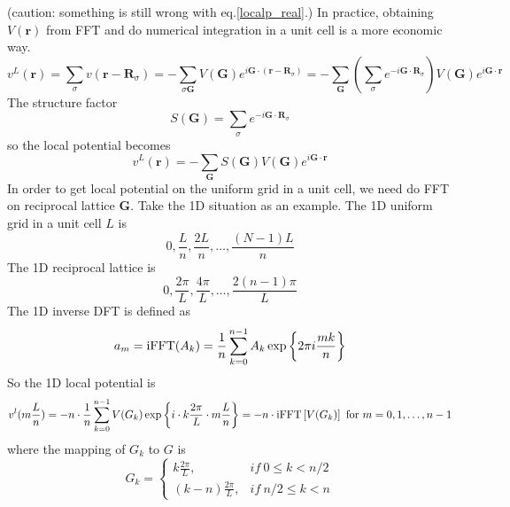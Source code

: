 \documentclass{article}
\begin{document}
            (caution: something is still wrong with eq.\eqref{localp_real}.)
            In practice, obtaining $V(\textbf{r})$ from FFT and do numerical integration in a unit cell is a more economic way.
            \begin{equation*}
                v^L(\textbf{r}) = \sum_{\sigma}v(\textbf{r}-\textbf{R}_{\sigma}) = 
                -\sum_{\sigma\textbf{G}}V(\textbf{G})e^{i\textbf{G}\cdot(\textbf{r}-\textbf{R}_{\sigma})} =
                -\sum_{\textbf{G}}\left(\sum_{\sigma}e^{-i\textbf{G}\cdot\textbf{R}_{\sigma}}\right)V(\textbf{G})e^{i\textbf{G}\cdot\textbf{r}}
            \end{equation*}
            The structure factor
            \begin{equation}
                S(\textbf{G}) = \sum_{\sigma}e^{-i\textbf{G}\cdot\textbf{R}_{\sigma}}
            \end{equation}
            so the local potential becomes
            \begin{equation}
                v^L(\textbf{r}) = -\sum_{\textbf{G}}S(\textbf{G})V(\textbf{G})e^{i\textbf{G}\cdot\textbf{r}}
            \end{equation}
            In order to get local potential on the uniform grid in a unit cell, 
            we need do FFT on reciprocal lattice $\textbf{G}$.
            Take the 1D situation as an example.
            The 1D uniform grid in a unit cell $L$ is
            $$ 0,\frac{L}{n},\frac{2L}{n},\dots,\frac{(N-1)L}{n} $$
            The 1D reciprocal lattice is
            $$ 0,\frac{2\pi}{L},\frac{4\pi}{L},\dots,\frac{2(n-1)\pi}{L} $$
            The 1D inverse DFT is defined as
            \begin{equation}
                a_m = {\rm iFFT}(A_k) = \frac{1}{n}\sum_{k=0}^{n-1}A_k\exp\left\{2\pi i\frac{mk}{n}\right\}
            \end{equation}
            So the 1D local potential is
            \begin{equation}
                v^l(m\frac{L}{n}) = -n\cdot\frac{1}{n}\sum_{k=0}^{n-1}V(G_k)\exp\left\{i\cdot k\frac{2\pi}{L}\cdot m\frac{L}{n}\right\}
                = -n\cdot {\rm iFFT}\left[V(G_k)\right]\ {\rm for}\ m = 0,1,\dots,n-1
            \end{equation}
            where the mapping of $G_k$ to $G$ is
            \begin{equation}
                G_k = \begin{cases}
                    k\frac{2\pi}{L}, & if\ 0\leq k<n/2 \\
                    (k-n)\frac{2\pi}{L}, & if\ n/2\leq k<n
                \end{cases}
            \end{equation}
\end{document}
